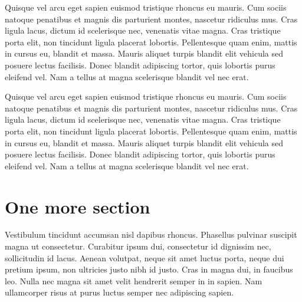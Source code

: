 \documentclass[twoside]{article}
\begin{document}
\begin{multicols}{2}
Quisque vel arcu eget sapien euismod tristique rhoncus eu mauris. Cum sociis natoque penatibus et magnis dis parturient montes, nascetur ridiculus mus. Cras ligula lacus, dictum id scelerisque nec, venenatis vitae magna. Cras tristique porta elit, non tincidunt ligula placerat lobortis. Pellentesque quam enim, mattis in cursus eu, blandit et massa. Mauris aliquet turpis blandit elit vehicula sed posuere lectus facilisis. Donec blandit adipiscing tortor, quis lobortis purus eleifend vel. Nam a tellus at magna scelerisque blandit vel nec erat.

Quisque vel arcu eget sapien euismod tristique rhoncus eu mauris. Cum sociis natoque penatibus et magnis dis parturient montes, nascetur ridiculus mus. Cras ligula lacus, dictum id scelerisque nec, venenatis vitae magna. Cras tristique porta elit, non tincidunt ligula placerat lobortis. Pellentesque quam enim, mattis in cursus eu, blandit et massa. Mauris aliquet turpis blandit elit vehicula sed posuere lectus facilisis. Donec blandit adipiscing tortor, quis lobortis purus eleifend vel. Nam a tellus at magna scelerisque blandit vel nec erat.

\section{One more section}
Vestibulum tincidunt accumsan nisl dapibus rhoncus. Phasellus pulvinar suscipit magna ut consectetur. Curabitur ipsum dui, consectetur id dignissim nec, sollicitudin id lacus. Aenean volutpat, neque sit amet luctus porta, neque dui pretium ipsum, non ultricies justo nibh id justo. Cras in magna dui, in faucibus leo. Nulla nec magna sit amet velit hendrerit semper in in sapien. Nam ullamcorper risus at purus luctus semper nec adipiscing sapien.

\end{multicols}
\end{document}
